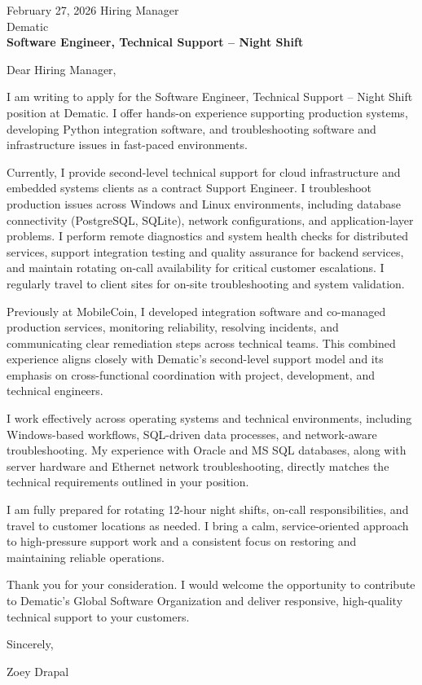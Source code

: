 \documentclass{../styles/coverletter}
\begin{document}
\populatedtitle





February 27, 2026\newline
Hiring Manager\\
Dematic\\[4pt]
	\textbf{Software Engineer, Technical Support -- Night Shift}\newline


Dear Hiring Manager,\newline


I am writing to apply for the Software Engineer, Technical Support -- Night Shift position at Dematic. I offer hands-on experience supporting production systems, developing Python integration software, and troubleshooting software and infrastructure issues in fast-paced environments.\newline

Currently, I provide second-level technical support for cloud infrastructure and embedded systems clients as a contract Support Engineer. I troubleshoot production issues across Windows and Linux environments, including database connectivity (PostgreSQL, SQLite), network configurations, and application-layer problems. I perform remote diagnostics and system health checks for distributed services, support integration testing and quality assurance for backend services, and maintain rotating on-call availability for critical customer escalations. I regularly travel to client sites for on-site troubleshooting and system validation.\newline

Previously at MobileCoin, I developed integration software and co-managed production services, monitoring reliability, resolving incidents, and communicating clear remediation steps across technical teams. This combined experience aligns closely with Dematic's second-level support model and its emphasis on cross-functional coordination with project, development, and technical engineers.\newline

I work effectively across operating systems and technical environments, including Windows-based workflows, SQL-driven data processes, and network-aware troubleshooting. My experience with Oracle and MS SQL databases, along with server hardware and Ethernet network troubleshooting, directly matches the technical requirements outlined in your position.\newline

I am fully prepared for rotating 12-hour night shifts, on-call responsibilities, and travel to customer locations as needed. I bring a calm, service-oriented approach to high-pressure support work and a consistent focus on restoring and maintaining reliable operations.\newline

Thank you for your consideration. I would welcome the opportunity to contribute to Dematic's Global Software Organization and deliver responsive, high-quality technical support to your customers.\newline



Sincerely,\newline

Zoey Drapal
\end{document}

